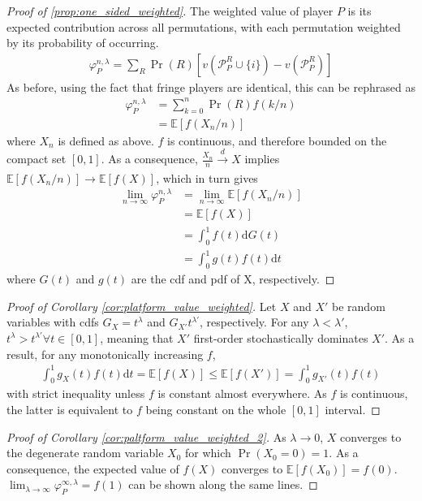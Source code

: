 \documentclass[a4paper]{article}
\newcommand{\dt}{\mathrm{d}t}
\newcommand{\E}{\mathbb{E}}
\begin{document}
\begin{proof}[Proof of \cref{prop:one_sided_weighted}]
    The weighted value of player $P$ is its expected contribution across all permutations, with each permutation weighted by its probability of occurring.
    \begin{align*}
        \varphi_P^{n, \lambda} = \sum_R \Pr(R) [v(\mathcal{P}_P^R \cup \{i\}) - v(\mathcal{P}_P^R)]
    \end{align*}
    As before, using the fact that fringe players are identical, this can be rephrased as
    \begin{align*}
        \varphi_P^{n, \lambda} &= \sum_{k=0}^n \Pr(R) f(k/n) \\
        &= \E[f(X_n / n)]
    \end{align*}
    where $X_n$ is defined as above.
    $f$ is continuous, and therefore bounded on the compact set $[0, 1]$.
    As a consequence, $\frac{X_n}{n} \xrightarrow[]{d} X$ implies $\E[f(X_n / n)] \to \E[f(X)]$, which in turn gives
    \begin{align*}
        \lim_{n \to \infty} \varphi_P^{n, \lambda} &= \lim_{n \to \infty} \E[f(X_n / n)] \\
        &= \E[f(X)] \\
        &= \int_0^1 f(t) \mathrm{d}G(t) \\
        &= \int_0^1 g(t)f(t) \dt
    \end{align*}
    where $G(t)$ and $g(t)$ are the cdf and pdf of X, respectively.
\end{proof}

\begin{proof}[Proof of Corollary \ref{cor:platform_value_weighted}]
    Let $X$ and $X'$ be random variables with cdfs $G_X = t^\lambda$ and $G_{X'}t^{\lambda'}$, respectively.
    For any $\lambda < \lambda'$, $t^\lambda > t^{\lambda'} \forall t \in [0, 1]$, meaning that $X'$ first-order stochastically dominates $X'$.
    As a result, for any monotonically increasing $f$,
    \begin{align*}
        \int_0^1 g_X(t)f(t) \dt = \E[f(X)] \leq \E[f(X')] = \int_0^1 g_{X'}(t)f(t)
    \end{align*}
    with strict inequality unless $f$ is constant almost everywhere.
    As $f$ is continuous, the latter is equivalent to $f$ being constant on the whole $[0, 1]$ interval.
\end{proof}

\begin{proof}[Proof of Corollary \ref{cor:paltform_value_weighted_2}]
    As $\lambda \to 0$, $X$ converges to the degenerate random variable $X_0$ for which $\Pr(X_0 = 0) = 1$.
    As a consequence, the expected value of $f(X)$ converges to $\E[f(X_0)] = f(0)$.
    $\lim_{\lambda \to \infty} \varphi^{\infty, \lambda}_P = f(1)$ can be shown along the same lines.
\end{proof}
\end{document}
